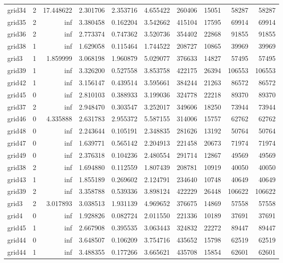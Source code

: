 \begin{longtable}{|l|r|r|r|r|r|r|r|r|r|}
grid34 & 2 & 17.448622 & 2.301706 & 2.353716 & 4.655422 & 260406 & 15051 & 58287 & 58287 \\
grid35 & 2 & inf & 3.380458 & 0.162204 & 3.542662 & 415104 & 17595 & 69914 & 69914 \\
grid36 & 2 & inf & 2.773374 & 0.747362 & 3.520736 & 354402 & 22868 & 91855 & 91855 \\
grid38 & 1 & inf & 1.629058 & 0.115464 & 1.744522 & 208727 & 10865 & 39969 & 39969 \\
grid3 & 1 & 1.859999 & 3.068198 & 1.960879 & 5.029077 & 376633 & 14827 & 57495 & 57495 \\
grid39 & 1 & inf & 3.326200 & 0.527558 & 3.853758 & 422175 & 26394 & 106553 & 106553 \\
grid42 & 1 & inf & 3.156147 & 0.439514 & 3.595661 & 384244 & 21263 & 86572 & 86572 \\
grid45 & 0 & inf & 2.810103 & 0.388933 & 3.199036 & 324778 & 22218 & 89370 & 89370 \\
grid37 & 2 & inf & 2.948470 & 0.303547 & 3.252017 & 349606 & 18250 & 73944 & 73944 \\
grid46 & 0 & 4.335888 & 2.631783 & 2.955372 & 5.587155 & 314006 & 15757 & 62762 & 62762 \\
grid48 & 0 & inf & 2.243644 & 0.105191 & 2.348835 & 281626 & 13192 & 50764 & 50764 \\
grid47 & 0 & inf & 1.639771 & 0.565142 & 2.204913 & 221458 & 20673 & 71974 & 71974 \\
grid49 & 0 & inf & 2.376318 & 0.104236 & 2.480554 & 291714 & 12867 & 49569 & 49569 \\
grid38 & 2 & inf & 1.694880 & 0.112559 & 1.807439 & 208781 & 10919 & 40050 & 40050 \\
grid43 & 1 & inf & 1.855189 & 0.269602 & 2.124791 & 234640 & 10748 & 40649 & 40649 \\
grid39 & 2 & inf & 3.358788 & 0.539336 & 3.898124 & 422229 & 26448 & 106622 & 106622 \\
grid3 & 2 & 3.017893 & 3.038513 & 1.931139 & 4.969652 & 376675 & 14869 & 57558 & 57558 \\
grid4 & 0 & inf & 1.928826 & 0.082724 & 2.011550 & 221336 & 10189 & 37691 & 37691 \\
grid45 & 1 & inf & 2.667908 & 0.395535 & 3.063443 & 324832 & 22272 & 89447 & 89447 \\
grid44 & 0 & inf & 3.648507 & 0.106209 & 3.754716 & 435652 & 15798 & 62519 & 62519 \\
grid44 & 1 & inf & 3.488355 & 0.177266 & 3.665621 & 435708 & 15854 & 62601 & 62601 \\

\end{longtable}
